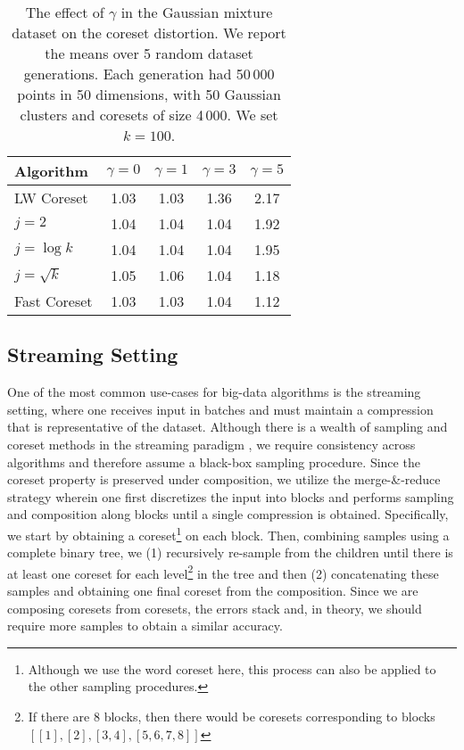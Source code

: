 \begin{table}[htbp]
    \centering
    \begin{tabular}{lcccc}
        Algorithm & $\gamma = 0$ & $\gamma = 1$ & $\gamma = 3$ & $\gamma = 5$\\
        \hline
        LW Coreset & 1.03 & 1.03 & 1.36 & 2.17\\
        $j=2$ & 1.04 & 1.04 & 1.04 & 1.92\\
        $j=\log k$ & 1.04 & 1.04 & 1.04 & 1.95\\
        $j=\sqrt{k}$ & 1.05 & 1.06 & 1.04 & 1.18\\
        Fast Coreset & 1.03 & 1.03 & 1.04 & 1.12
    \end{tabular}
    \caption{The effect of $\gamma$ in the Gaussian mixture dataset on the coreset distortion. We report the means over 5 random dataset generations.
    Each generation had 50\,000 points in 50 dimensions, with 50 Gaussian clusters and coresets of size 4\,000. We set $k=100$.}
    \label{tbl:class-imbalance}
\end{table}


\subsection{Streaming Setting}
\label{ssec:streaming}

One of the most common use-cases for big-data algorithms is the streaming setting, where one receives input in batches and must maintain a compression that is
representative of the dataset. Although there is a wealth of sampling and coreset methods in the streaming paradigm , we require consistency
across algorithms and therefore assume a black-box sampling procedure. Since the coreset property is preserved under composition, we utilize the merge-\&-reduce
strategy  wherein one first discretizes the input into blocks and performs sampling and composition along blocks until a single compression
is obtained. Specifically, we start by obtaining a coreset\footnote{Although we use the word coreset here, this process can also be applied to the other
sampling procedures.} on each block. Then, combining samples using a complete binary tree, we (1) recursively re-sample from the children until there is at
least one coreset for each level\footnote{If there are 8 blocks, then there would be coresets corresponding to blocks $[[1], [2], [3, 4], [5, 6, 7, 8]]$} in the
tree and then (2) concatenating these samples and obtaining one final coreset from the composition. Since we are composing coresets from coresets, the errors
stack and, in theory, we should require more samples to obtain a similar accuracy. 

